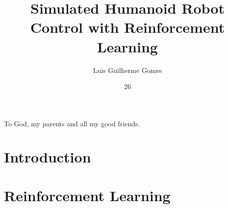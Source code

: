 \documentclass[tg, eng]{ita}    %
\author{Luis Guilherme Gomes}{Aguiar}
\title{Simulated Humanoid Robot Control with Reinforcement Learning}
\date{26}{Junho}{2018}
\begin{document}
\maketitle

\begin{itadedication}
To God, my parents and all my good friends.
\end{itadedication}

\begin{itathanks}

\end{itathanks}


\begin{abstract}
\noindent

\end{abstract}

\begin{englishabstract}
\noindent

\end{englishabstract}

\listoffigures %


\listofabbreviations

\listofsymbols

\tableofcontents

\mainmatter

\chapter{Introduction}
\label{chap:introduction}


\chapter{Reinforcement Learning}
\label{chap:rl}

\end{document}

